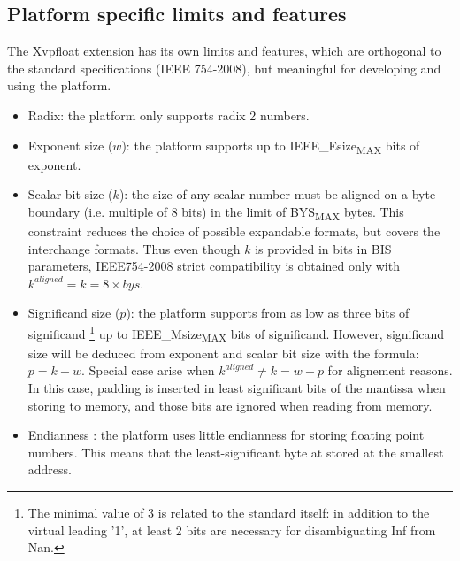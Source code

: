 \subsection{Platform specific limits and features}

The Xvpfloat extension has its own limits and features, which are orthogonal to
the standard specifications (IEEE 754-2008), but meaningful for developing and using the platform.

\begin{itemize}[topsep=0pt]
\item Radix: the platform only supports radix 2 numbers.
\item Exponent size ($w$): the platform supports up to IEEE\_Esize\textsubscript{MAX} bits of exponent.
\item Scalar bit size ($k$): the size of any scalar number must be aligned on a byte boundary (i.e. multiple of 8 bits) in the limit of BYS\textsubscript{MAX} bytes.
This constraint reduces the choice of possible expandable formats, but covers the interchange formats.
Thus even though $k$ is provided in bits in BIS parameters, IEEE754-2008 strict compatibility is obtained only with $k^{aligned} = k = 8 \times bys$.
\item Significand size ($p$): the platform supports from as low as three bits of significand \footnote{The minimal value of 3 is related to the standard itself: in addition to the virtual leading '1', at least 2 bits are necessary for disambiguating Inf from Nan.} up to IEEE\_Msize\textsubscript{MAX} bits of significand.
However, significand size will be deduced from exponent and scalar bit size with the formula: $p=k-w$.
Special case arise when $k^{aligned} \neq k=w+p$ for alignement reasons.
In this case, padding is inserted in least significant bits of the mantissa when storing to memory, and those bits are ignored when reading from memory.
\item Endianness : the platform uses little endianness for storing floating point numbers.
This means that the least-significant byte at stored at the smallest address.
\end{itemize}

